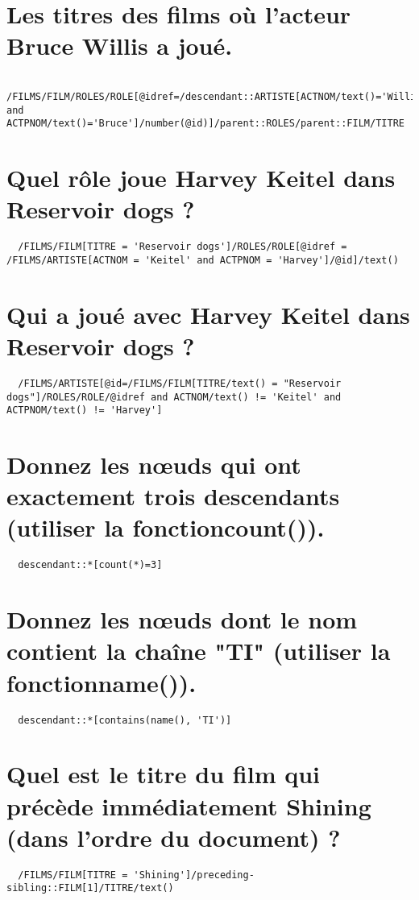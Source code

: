 \section{Les titres des films où l’acteur Bruce Willis a joué.}
\begin{verbatim}
  /FILMS/FILM/ROLES/ROLE[@idref=/descendant::ARTISTE[ACTNOM/text()='Willis' and ACTPNOM/text()='Bruce']/number(@id)]/parent::ROLES/parent::FILM/TITRE
\end{verbatim}

\section{Quel rôle joue Harvey Keitel dans Reservoir dogs ?}
\begin{verbatim}
  /FILMS/FILM[TITRE = 'Reservoir dogs']/ROLES/ROLE[@idref = /FILMS/ARTISTE[ACTNOM = 'Keitel' and ACTPNOM = 'Harvey']/@id]/text()
\end{verbatim}

\section{Qui a joué avec Harvey Keitel dans Reservoir dogs ?}
\begin{verbatim}
  /FILMS/ARTISTE[@id=/FILMS/FILM[TITRE/text() = "Reservoir dogs"]/ROLES/ROLE/@idref and ACTNOM/text() != 'Keitel' and ACTPNOM/text() != 'Harvey']
\end{verbatim}

\section{Donnez les nœuds qui ont exactement trois descendants (utiliser la fonctioncount()).}
\begin{verbatim}
  descendant::*[count(*)=3]
\end{verbatim}

\section{Donnez les nœuds dont le nom contient la chaîne "TI" (utiliser la fonctionname()).}
\begin{verbatim}
  descendant::*[contains(name(), 'TI')] 
\end{verbatim}

\section{Quel est le titre du film qui précède immédiatement Shining (dans l’ordre du document) ?}
\begin{verbatim}
  /FILMS/FILM[TITRE = 'Shining']/preceding-sibling::FILM[1]/TITRE/text()
\end{verbatim}